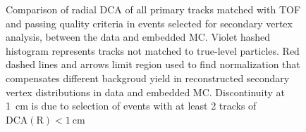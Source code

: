 \begin{figure}[t!]
\begin{minipage}{.4725\textwidth}
  \caption[Comparison of radial DCA of all primary tracks matched with TOF and passing quality criteria in events selected for secondary vertex analysis, between the data and embedded MC.]
   {Comparison of radial DCA of all primary tracks matched with TOF and passing quality criteria in events selected for secondary vertex analysis, between the data and embedded MC. Violet hashed histogram represents tracks not matched to true-level particles. Red dashed lines and arrows limit region used to find normalization that compensates different backgroud yield in reconstructed secondary vertex distributions in data and embedded MC. Discontinuity at 1~cm is due to selection of events with at least 2 tracks of $\text{DCA}(\text{R})<1~\text{cm}$}
   \label{fig:primaryDcaSelectedEvtsDataVsMC}%
\end{minipage}%
\end{figure}%

